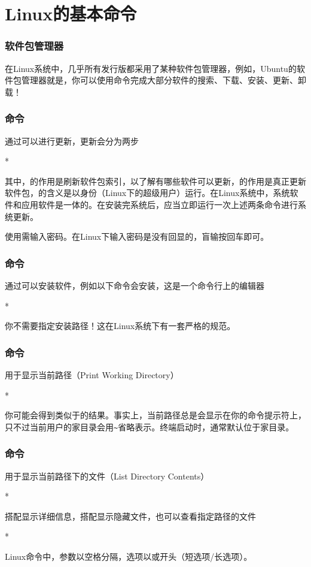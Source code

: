 \section{Linux的基本命令}

\begin{frame}
    \frametitle{软件包管理器}
    在Linux系统中，几乎所有发行版都采用了某种软件包管理器，例如，Ubuntu的软件包管理器就是，你可以使用命令完成大部分软件的搜索、下载、安装、更新、卸载！
\end{frame}

\begin{frame}
    \frametitle{命令}
    通过可以进行更新，更新会分为两步
    \begin{Code}*
        
    \end{Code}
    其中，的作用是刷新软件包索引，以了解有哪些软件可以更新，的作用是真正更新软件包，的含义是以身份（Linux下的超级用户）运行。在Linux系统中，系统软件和应用软件是一体的。在安装完系统后，应当立即运行一次上述两条命令进行系统更新。

    使用需输入密码。在Linux下输入密码是没有回显的，盲输按回车即可。
\end{frame}

\begin{frame}
    \frametitle{命令}
    通过可以安装软件，例如以下命令会安装，这是一个命令行上的编辑器
    \begin{Code}*
        
    \end{Code}
    你不需要指定安装路径！这在Linux系统下有一套严格的规范。
\end{frame}

\begin{frame}
    \frametitle{命令}
    用于显示当前路径（Print Working Directory）
    \begin{Code}*
        
    \end{Code}
    你可能会得到类似于的结果。事实上，当前路径总是会显示在你的命令提示符上，只不过当前用户的家目录会用\texttt{\textasciitilde{}}省略表示。终端启动时，通常默认位于家目录。
\end{frame}

\begin{frame}
    \frametitle{命令}
    用于显示当前路径下的文件（List Directory Contents）
    \begin{Code}*
        
    \end{Code}
    搭配显示详细信息，搭配显示隐藏文件，也可以查看指定路径的文件
    \begin{Code}*
        
    \end{Code}
    Linux命令中，参数以空格分隔，选项以\code{-}或\code{--}开头（短选项/长选项）。
\end{frame}

